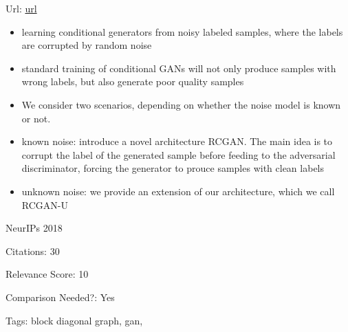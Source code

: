 \documentclass[11pt]{article}
\begin{document}
\noindent Url: \href{https://papers.nips.cc/paper/8229-robustness-of-conditional-gans-to-noisy-labels.pdf}{url}

\begin{itemize}
  \item learning conditional generators from noisy labeled samples, where the labels are corrupted by random noise
  \item standard training of conditional GANs will not only produce samples with wrong labels, but also generate poor quality samples
  \item We consider two scenarios, depending on whether the noise model is known or not.
  \item known noise: introduce a novel architecture RCGAN. The main idea is to corrupt the label of the generated sample before feeding to the adversarial discriminator, forcing the generator to prouce samples with clean labels
  \item unknown noise: we provide an extension of our architecture, which we call RCGAN-U
\end{itemize}

\vspace{2cm}

\noindent NeurIPs 2018

\noindent Citations: 30

\noindent Relevance Score: 10

\noindent Comparison Needed?: Yes

\noindent Tags: block diagonal graph, gan, 
\end{document}
